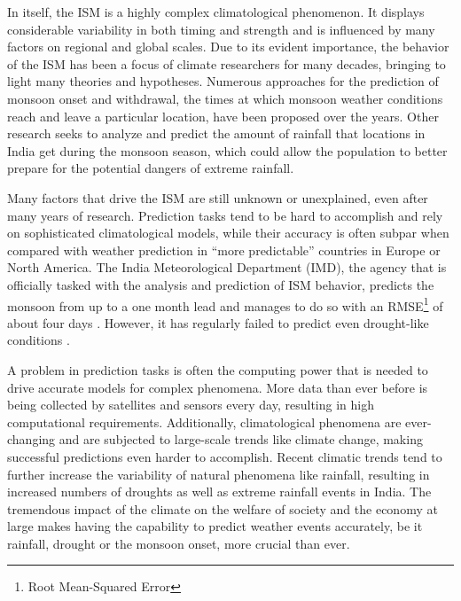 In itself, the ISM is a highly complex climatological phenomenon. It displays considerable variability in both timing and strength and is influenced by many factors on regional and global scales. Due to its evident importance, the behavior of the ISM has been a focus of climate researchers for many decades, bringing to light many theories and hypotheses. Numerous approaches for the prediction of monsoon onset and withdrawal, the times at which monsoon weather conditions reach and leave a particular location, have been proposed over the years. Other research seeks to analyze and predict the amount of rainfall that locations in India get during the monsoon season, which could allow the population to better prepare for the potential dangers of extreme rainfall.

Many factors that drive the ISM are still unknown or unexplained, even after many years of research. Prediction tasks tend to be hard to accomplish and rely on sophisticated climatological models, while their accuracy is often subpar when compared with weather prediction in ``more predictable'' countries in Europe or North America. The India Meteorological Department (IMD), the agency that is officially tasked with the analysis and prediction of ISM behavior, predicts the monsoon from up to a one month lead and manages to do so with an RMSE\footnote{Root Mean-Squared Error} of about four days \citep{Pradhan.2017}. However, it has regularly failed to predict even drought-like conditions \citep{Paliwal.24.09.2017}.

A problem in prediction tasks is often the computing power that is needed to drive accurate models for complex phenomena. More data than ever before is being collected by satellites and sensors every day, resulting in high computational requirements. Additionally, climatological phenomena are ever-changing and are subjected to large-scale trends like climate change, making successful predictions even harder to accomplish. Recent climatic trends tend to further increase the variability of natural phenomena like rainfall, resulting in increased numbers of droughts as well as extreme rainfall events in India. The tremendous impact of the climate on the welfare of society and the economy at large makes having the capability to predict weather events accurately, be it rainfall, drought or the monsoon onset, more crucial than ever.

